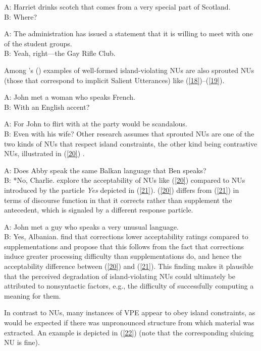 \documentclass[output=paper
                ,modfonts
                ,nonflat
	        ,collection
	        ,collectionchapter
	        ,collectiontoclongg
 	        ,biblatex
                ,babelshorthands
                ,newtxmath
                ,draftmode
                ,colorlinks, citecolor=brown
]{./langsci/langscibook}
\begin{document}
{\ea A: Harriet drinks scotch that comes from a very special part of Scotland.\\B: Where? \citep[245]{CJ2005a} \label{16}\z

\ea A: The administration has issued a statement that it is willing to meet with one of the student groups.\\B: Yeah, right---the Gay Rifle Club. \citep[245]{CJ2005a} \label{17}\z

Among \citeauthor{CJ2005a}'s (\citeyear[245]{CJ2005a}) examples of well-formed island-violating NUs are also sprouted NUs (those that correspond to implicit Salient Utterances) like (\ref{18})--(\ref{19}).

\ea A: John met a woman who speaks French.\\B: With an English accent?\label{18}\z

\ea A: For John to flirt with at the party would be scandalous. \\B: Even with his wife?\label{19}\z
Other research assumes that sprouted NUs are one of the two kinds of NUs that respect island constraints, the other kind being contrastive NUs, illustrated in (\ref{20}) \citep{Chung1995, Merchant2001, Griffiths2014}.

\ea A: Does Abby speak the same Balkan language that Ben speaks?\\
B: *No, Charlie. \citep{Merchant2001}  \label{20}\z
%
\citet{Schmeh2015} explore the acceptability of NUs like (\ref{20}) compared to NUs introduced by the particle \emph{Yes} depicted in (\ref{21}). (\ref{20}) differs from (\ref{21}) in terms of discourse function in that it corrects rather than supplement the antecedent, which is signaled by a different response particle.

\ea A: John met a guy who speaks a very unusual language. \\B: Yes, Albanian. \citep[245]{CJ2005a} \label{21}\z
%
\citet{Schmeh2015} find that corrections lower acceptability ratings compared to supplementations and propose that this follows from the fact that corrections induce greater processing difficulty than supplementations do, and hence the acceptability difference between (\ref{20}) and (\ref{21}). This finding makes it plausible that the perceived degradation of island-violating NUs could ultimately be attributed to nonsyntactic factors, e.g., the difficulty of successfully computing a meaning for them.

In contrast to NUs, many instances of VPE appear to obey island constraints, as would be expected if there was unpronounced structure from which material was extracted. An example is depicted in (\ref{22}) (note that the corresponding sluicing NU is fine).

}
\end{document}
